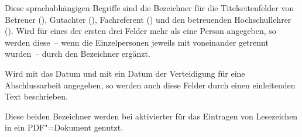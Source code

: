 \documentclass[%
  english,ngerman,%
  headings=optiontoheadandtoc,captions=tableheading,numbers=noenddot,%
  chapterpage,cdfoot,%
]{tudscrman}
\begin{document}
\begin{Declaration}{}
\begin{Declaration}{}
\begin{Declaration}{}
\begin{Declaration}{}
\begin{Declaration}{}
\begin{Declaration}{}
\begin{Declaration}{}
\printdeclarationlist%
%
%
%
%
Diese sprachabhängigen Begriffe sind die Bezeichner für die Titelseitenfelder 
von Betreuer (), Gutachter (), Fachreferent 
() und den betreuenden Hochschullehrer (). Wird 
für eines der ersten drei Felder mehr als eine Person angegeben, so werden 
diese~-- wenn die Einzelpersonen jeweils mit  voneinander getrennt 
wurden~-- durch den Bezeichner  ergänzt.
\end{Declaration}
\end{Declaration}
\end{Declaration}
\end{Declaration}
\end{Declaration}
\end{Declaration}
\end{Declaration}

\begin{Declaration}{}
\begin{Declaration}{}
\printdeclarationlist%
%
%
%
Wird mit  das Datum und mit  ein Datum der 
Verteidigung für eine Abschlussarbeit angegeben, so werden auch diese Felder 
durch einen einleitenden Text beschrieben.
\end{Declaration}
\end{Declaration}


\begin{Declaration}{}
\begin{Declaration}{}
\printdeclarationlist%
%
%
Diese beiden Bezeichner werden bei aktivierter  für das 
Eintragen von Lesezeichen in ein PDF"=Dokument genutzt.
\end{Declaration}
\end{Declaration}
\end{document}
